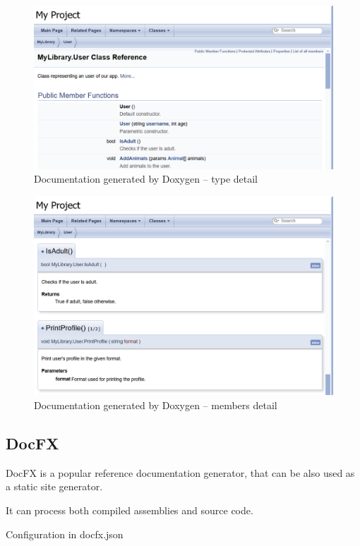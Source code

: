 \begin{figure}
\centering
\includegraphics[width=1\linewidth]{img/doxygen1.png}
\caption{Documentation generated by Doxygen -- type detail}
\label{fig:doxygen1}
\end{figure}

\begin{figure}
\centering
\includegraphics[width=1\linewidth]{img/doxygen2.png}
\caption{Documentation generated by Doxygen -- members detail}
\label{fig:doxygen2}
\end{figure}

\subsection{DocFX}


DocFX is a popular reference documentation generator, that can be also used as a static site generator. 

It can process both compiled assemblies and source code.

Configuration in docfx.json

